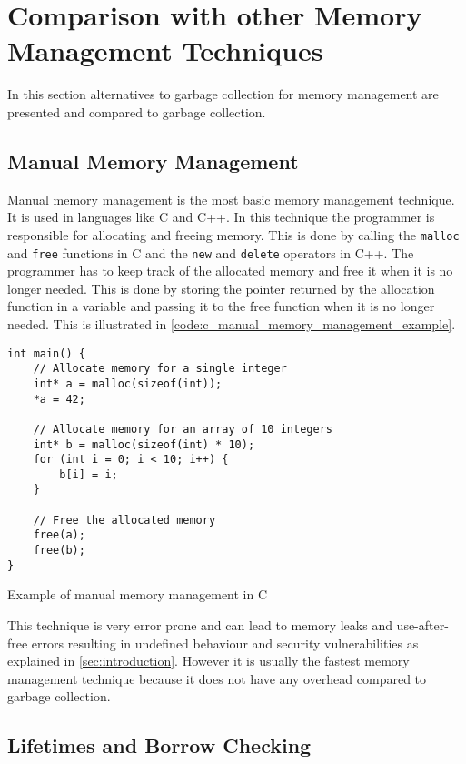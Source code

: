 \chapter{Comparison with other Memory Management Techniques}

In this section alternatives to garbage collection for memory management
are presented and compared to garbage collection.

\section{Manual Memory Management}

Manual memory management is the most basic memory management technique.
It is used in languages like C and C++.
In this technique the programmer is responsible for allocating and freeing memory.
This is done by calling the \texttt{malloc} and \texttt{free} functions in C and the \texttt{new} and \texttt{delete} operators in C++.
The programmer has to keep track of the allocated memory and free it when it is no longer needed.
This is done by storing the pointer returned by the allocation function in a variable and passing it to the free function when it is no longer needed.
This is illustrated in \autoref{code:c_manual_memory_management_example}.

\begin{listing}[H] 
    \begin{verbatim}
int main() {
    // Allocate memory for a single integer
    int* a = malloc(sizeof(int));
    *a = 42;

    // Allocate memory for an array of 10 integers
    int* b = malloc(sizeof(int) * 10);
    for (int i = 0; i < 10; i++) {
        b[i] = i;
    }

    // Free the allocated memory
    free(a);
    free(b);
}
    \end{verbatim}
    \caption{Example of manual memory management in C}
    \label{code:c_manual_memory_management_example}
\end{listing}

This technique is very error prone and can lead to memory leaks and use-after-free errors
resulting in undefined behaviour and security vulnerabilities as explained in \autoref{sec:introduction}.
However it is usually the fastest memory management technique because it does not have any overhead
compared to garbage collection.


\section{Lifetimes and Borrow Checking}

